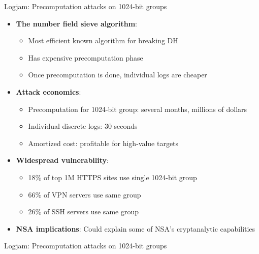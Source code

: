\documentclass[aspectratio=169, lualatex, handout]{beamer}
\begin{document}
\begin{frame}{Logjam: Precomputation attacks on 1024-bit groups}
	\begin{itemize}[<+->]
		\item \textbf{The number field sieve algorithm}:
		      \begin{itemize}
			      \item Most efficient known algorithm for breaking DH
			      \item Has expensive precomputation phase
			      \item Once precomputation is done, individual logs are cheaper
		      \end{itemize}
		\item \textbf{Attack economics}:
		      \begin{itemize}
			      \item Precomputation for 1024-bit group: several months, millions of dollars
			      \item Individual discrete logs: 30 seconds
			      \item Amortized cost: profitable for high-value targets
		      \end{itemize}
		\item \textbf{Widespread vulnerability}:
		      \begin{itemize}
			      \item 18\% of top 1M HTTPS sites use single 1024-bit group
			      \item 66\% of VPN servers use same group
			      \item 26\% of SSH servers use same group
		      \end{itemize}
		\item \textbf{NSA implications}: Could explain some of NSA's cryptanalytic capabilities
	\end{itemize}
\end{frame}

\begin{frame}{Logjam: Precomputation attacks on 1024-bit groups}
\end{frame}
\end{document}
